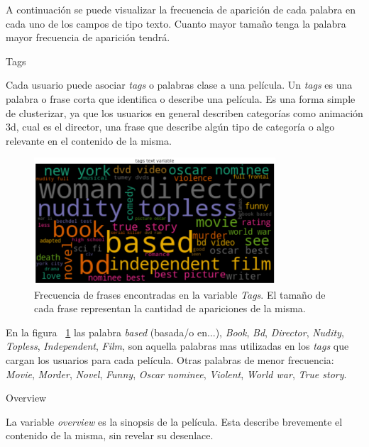 \documentclass[11pt,a4paper,twoside]{thesis}
\begin{document}
A continuación se puede visualizar la frecuencia de aparición de cada palabra
en cada uno de los campos de tipo texto. Cuanto mayor tamaño tenga la palabra
mayor frecuencia de aparición tendrá.

\begin{description}
	\item[Tags]
\end{description}

Cada usuario puede asociar \textit{tags} o palabras clase a una película. Un
\textit{tags} es una palabra o frase corta que identifica o describe una
película. Es una forma simple de clusterizar, ya que los usuarios en general
describen categorías como animación 3d, cual es el director, una frase que
describe algún tipo de categoría o algo relevante en el contenido de la misma.

\begin{figure}[h!]
	\centering
	\includegraphics[width=9cm]{./images/Cloud-tags.png}
	\caption{Frecuencia de frases encontradas en la variable \textit{Tags}. El tamaño de cada frase representan la cantidad de apariciones de la misma.}
	\label{fig:tagsCloud}
\end{figure}

En la figura ~\ref{fig:tagsCloud} las palabra \textit{based} (basada/o en...),
\textit{Book}, \textit{Bd}, \textit{Director}, \textit{Nudity},
\textit{Topless}, \textit{Independent}, \textit{Film}, son aquella palabras mas
utilizadas en los \textit{tags} que cargan los usuarios para cada película.
Otras palabras de menor frecuencia: \textit{Movie}, \textit{Morder},
\textit{Novel}, \textit{Funny}, \textit{Oscar nominee}, \textit{Violent},
\textit{World war}, \textit{True story}.

\clearpage

\begin{description}
	\item[Overview]
\end{description}

La variable \textit{overview} es la sinopsis de la película. Esta describe
brevemente el contenido de la misma, sin revelar su desenlace.
\end{document}
